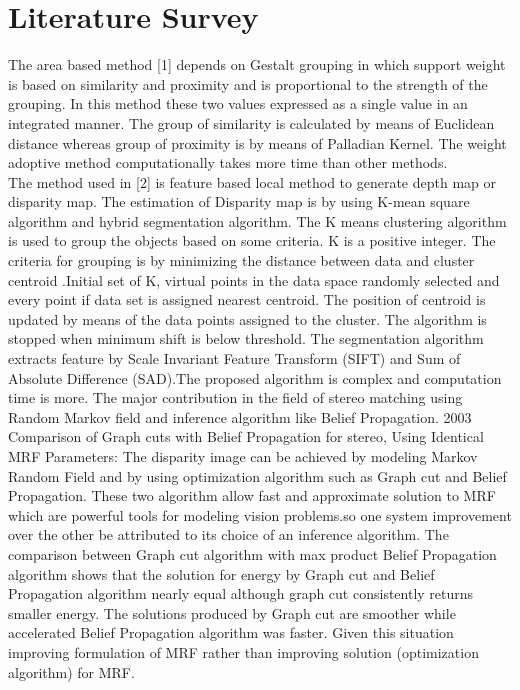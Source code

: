 \chapter{Literature Survey}

The area based method [1] depends on Gestalt grouping in which support weight is based on similarity and proximity and is proportional to the strength of the grouping. In this method these two values expressed as a single value in an integrated manner. The group of similarity is calculated by means of Euclidean distance whereas group of proximity is by means of Palladian Kernel. The weight adoptive method computationally takes more time than other methods.\\
The method used in [2] is feature based local method to generate depth map or disparity map. The estimation of Disparity map is by using K-mean square algorithm and hybrid segmentation algorithm. The K means clustering algorithm is used to group the objects based on some criteria. K is a positive integer. The criteria for grouping is by minimizing the distance between data and cluster centroid .Initial set of K, virtual points in the data space randomly selected and every point if data set is assigned nearest centroid. The position of centroid is updated by means of the data points assigned to the cluster. The algorithm is stopped when minimum shift is below threshold. The segmentation algorithm extracts feature by Scale Invariant Feature Transform (SIFT) and Sum of Absolute Difference (SAD).The proposed algorithm is complex and computation time is more.
%
The major contribution in the field of stereo matching using Random Markov field and inference algorithm like Belief Propagation.
2003 Comparison of Graph cuts with Belief Propagation for stereo, Using Identical MRF Parameters:
The disparity image can be achieved by modeling Markov Random Field and by using optimization algorithm such as Graph cut and Belief Propagation. These two algorithm allow fast and approximate solution to MRF which are powerful tools for modeling vision problems.so one system improvement over the other be attributed to its choice of an inference algorithm.
The comparison between Graph cut algorithm with max product Belief Propagation algorithm shows that the solution for energy by Graph cut and Belief Propagation algorithm nearly equal although graph cut consistently returns smaller energy. The solutions produced by Graph cut are smoother while accelerated Belief Propagation algorithm was faster.
Given this situation improving formulation of MRF rather than improving solution (optimization algorithm) for MRF.
